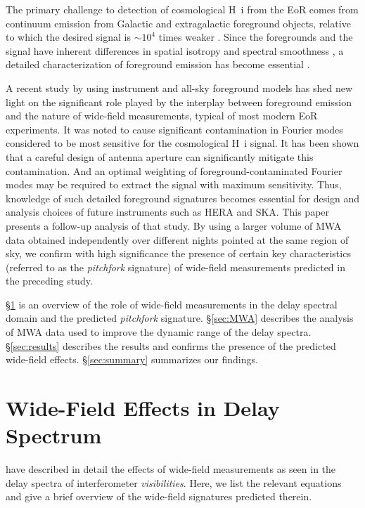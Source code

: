 \documentclass[preprint2,apjl,numberedappendix,twocolappendix,appendixfloats]{emulateapj}
\begin{document}
The primary challenge to detection of cosmological H~{\sc i} from the EoR comes from continuum emission from Galactic and extragalactic foreground objects, relative to which the desired signal is $\sim 10^4$ times weaker \citep[see, e.g.,][]{dim02,zal04,fur06,ali08,ber09,ber10,gho12}. Since the foregrounds and the signal have inherent differences in spatial isotropy and spectral smoothness \citep{mor04,mor06,bow09,liu11,par12b,dil13,pob13}, a detailed characterization of foreground emission has become essential \citep{bow09,liu09,dat10,liu11,mor12,tro12,pob13,dil14,liu14a,liu14b,thy13,thy15}.

A recent study by \citet{thy15} using instrument and all-sky foreground models has shed new light on the significant role played by the interplay between foreground emission and the nature of wide-field measurements, typical of most modern EoR experiments. It was noted to cause significant contamination in Fourier modes considered to be most sensitive for the cosmological H~{\sc i} signal. It has been shown that a careful design of antenna aperture can significantly mitigate this contamination. And an optimal weighting of foreground-contaminated Fourier modes may be required to extract the signal with maximum sensitivity. Thus, knowledge of such detailed foreground signatures becomes essential for design and analysis choices of future instruments such as HERA and SKA. This paper presents a follow-up analysis of that study. By using a larger volume of MWA data obtained independently over different nights pointed at the same region of sky, we confirm with high significance the presence of certain key characteristics (referred to as the {\it pitchfork} signature) of wide-field measurements predicted in the preceding study.

\S\ref{sec:wide-field} is an overview of the role of wide-field measurements in the delay spectral domain and the predicted {\it pitchfork} signature. \S\ref{sec:MWA} describes the analysis of MWA data used to improve the dynamic range of the delay spectra. \S\ref{sec:results} describes the results and confirms the presence of the predicted wide-field effects. \S\ref{sec:summary} summarizes our findings.

\section{Wide-Field Effects in Delay Spectrum}\label{sec:wide-field}

\citet{thy15} have described in detail the effects of wide-field measurements as seen in the delay spectra of interferometer {\it visibilities}. Here, we list the relevant equations and give a brief overview of the wide-field signatures predicted therein. 
\end{document}
